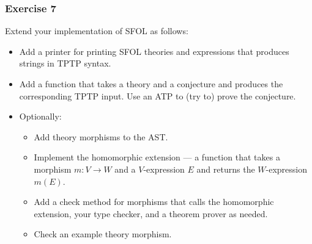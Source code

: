 
\begin{frame}\frametitle{Exercise 7}
Extend your implementation of SFOL as follows:
\begin{itemize}
\item Add a printer for printing SFOL theories and expressions that produces strings in TPTP syntax.
\item Add a function that takes a theory and a conjecture and produces the corresponding TPTP input. Use an ATP to (try to) prove the conjecture.
\item Optionally:
\begin{itemize}
 \item Add theory morphisms to the AST.
 \item Implement the homomorphic extension --- a function that takes a morphism $m:V\to W$ and a $V$-expression $E$ and returns the $W$-expression $m(E)$.
 \item Add a check method for morphisms that calls the homomorphic extension, your type checker, and a theorem prover as needed.
 \item Check an example theory morphism.
\end{itemize}
\end{itemize}
\end{frame}
